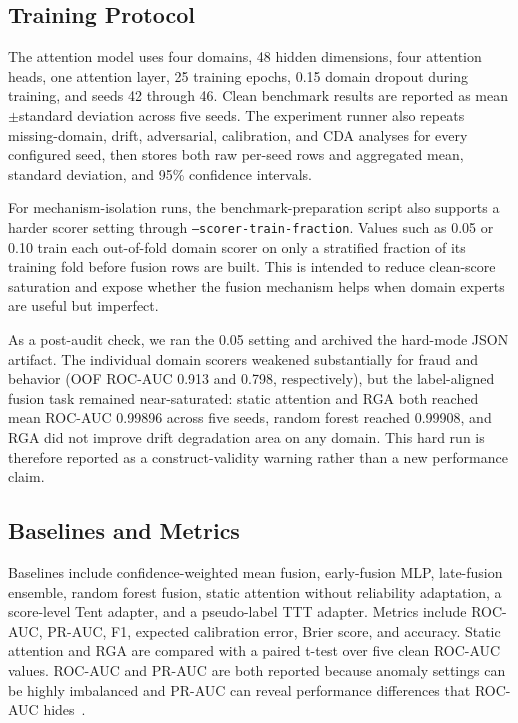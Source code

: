 \documentclass[10pt,conference]{IEEEtran}
\newcommand{\method}{RGA}
\begin{document}
\subsection{Training Protocol}
The attention model uses four domains, 48 hidden dimensions, four attention
heads, one attention layer, 25 training epochs, 0.15 domain dropout during
training, and seeds 42 through 46. Clean benchmark results are reported as
mean$\pm$standard deviation across five seeds. The experiment runner
also repeats missing-domain, drift, adversarial, calibration, and CDA analyses
for every configured seed, then stores both raw per-seed rows and aggregated
mean, standard deviation, and 95\% confidence intervals.

For mechanism-isolation runs, the benchmark-preparation script also supports a
harder scorer setting through \texttt{--scorer-train-fraction}. Values such as
0.05 or 0.10 train each out-of-fold domain scorer on only a stratified fraction
of its training fold before fusion rows are built. This is intended to reduce
clean-score saturation and expose whether the fusion mechanism helps when
domain experts are useful but imperfect.

As a post-audit check, we ran the 0.05 setting and archived the hard-mode JSON
artifact. The individual domain scorers weakened substantially for fraud and
behavior (OOF ROC-AUC 0.913 and 0.798, respectively), but the label-aligned
fusion task remained near-saturated: static attention and \method{} both
reached mean ROC-AUC 0.99896 across five seeds, random forest reached 0.99908,
and \method{} did not improve drift degradation area on any domain. This hard
run is therefore reported as a construct-validity warning rather than a new
performance claim.

\subsection{Baselines and Metrics}
Baselines include confidence-weighted mean fusion, early-fusion MLP,
late-fusion ensemble, random forest fusion, static attention without
reliability adaptation, a score-level Tent adapter, and a pseudo-label TTT
adapter. Metrics include ROC-AUC, PR-AUC, F1, expected calibration error, Brier
score, and accuracy. Static attention and \method{} are compared with a paired
t-test over five clean ROC-AUC values. ROC-AUC and PR-AUC are both reported
because anomaly settings can be highly imbalanced and PR-AUC can reveal
performance differences that ROC-AUC hides~\cite{davis2006relationship}.
\end{document}
